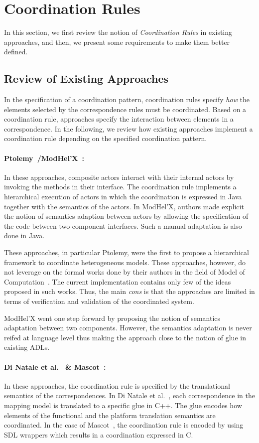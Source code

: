\section{Coordination Rules}
In this section, we first review the notion of \emph{Coordination Rules} in existing approaches, and then, we present some requirements to make them better defined. 

\subsection{Review of Existing Approaches}
In the specification of a coordination pattern, coordination rules specify \emph{how} the elements selected by the correspondence rules must be coordinated. Based on a coordination rule, approaches specify the interaction between elements in a correspondence. In the following, we review how existing approaches implement a coordination rule depending on the specified coordination pattern.  

\paragraph{Ptolemy~\cite{ptoleframebib}/ModHel'X~\cite{modhelxbib}:}	
In these approaches, composite actors interact with their internal actors by invoking the methods in their interface. The coordination rule implements a hierarchical execution of actors in which the coordination is expressed in Java together with the semantics of the actors. In ModHel'X, authors made explicit the notion of semantics adaption between actors by allowing the specification of the code between two component interfaces. Such a manual adaptation is also done in Java.

These approaches, in particular Ptolemy, were the first to propose a hierarchical framework to coordinate heterogeneous models. These approaches, however, do not leverage on the formal works done by their authors in the field of Model of Computation~\cite{lee1998framework}. The current implementation contains only few of the ideas proposed in such works. Thus, the main \emph{cons} is that the approaches are limited in terms of verification and validation of the coordinated system. 

ModHel'X went one step forward by proposing the notion of semantics adaptation between two components. However, the semantics adaptation is never reifed at language level thus making the approach close to the notion of glue in existing ADLs.

\paragraph{Di Natale et al.~\cite{dinatale} \& Mascot~\cite{mascotbib}:}
In these approaches, the coordination rule is specified by the translational semantics of the correspondences. In Di Natale et al.~\cite{dinatale}, each correspondence in the mapping model is translated to a specific glue in C++. The glue encodes how elements of the functional and the platform translation semantics are coordinated. In the case of Mascot~\cite{mascotbib}, the coordination rule is encoded by using SDL wrappers which results in a coordination expressed in C.

